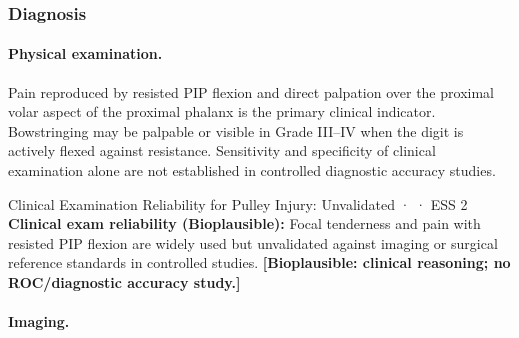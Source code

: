 \subsubsection{Diagnosis}

\paragraph{Physical examination.}
Pain reproduced by resisted PIP flexion and direct palpation over the proximal volar aspect of the proximal phalanx is the primary clinical indicator. Bowstringing may be palpable or visible in Grade III--IV when the digit is actively flexed against resistance. Sensitivity and specificity of clinical examination alone are not established in controlled diagnostic accuracy studies.

\begin{bioplausbox}{Clinical Examination Reliability for Pulley Injury: Unvalidated · \bioplausible · ESS 2}
\textbf{Clinical exam reliability (Bioplausible):} Focal tenderness and pain with resisted PIP flexion are widely used but unvalidated against imaging or surgical reference standards in controlled studies. \textbf{[Bioplausible: clinical reasoning; no ROC/diagnostic accuracy study.]}
\end{bioplausbox}

\paragraph{Imaging.}\leavevmode

